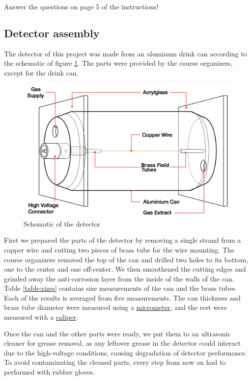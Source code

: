 \documentclass[a4paper]{article}
\begin{document}
Answer the questions on page 5 of the instructions!


\subsection{Detector assembly}
\label{assembly}
The detector of this project was made from an aluminum drink can according to the schematic of figure \ref{fig:schematic}.
The parts were provided by the course organizers, except for the drink can.

\begin{figure}[ht!]
\centering
\includegraphics[width=\textwidth]{fig/instructions/schematic.png}
\caption{Schematic of the detector \cite{instructions}}
\label{fig:schematic}
\end{figure}

First we prepared the parts of the detector by removing a single strand from a copper wire and cutting two pieces of brass tube for the wire mounting.
The course organizers removed the top of the can and drilled two holes to its bottom, one to the center and one off-center.
We then smoothened the cutting edges and grinded away the anti-corrosion layer from the inside of the walls of the can.
Table \ref{table:sizes} contains size measurements of the can and the brass tubes.
Each of the results is averaged from five measurements.
The can thickness and brass tube diameter were measured using a
\href{https://en.wikipedia.org/wiki/Micrometer}{micrometer}, and the rest were measured with a
\href{https://en.wikipedia.org/wiki/Calipers}{caliper}.

Once the can and the other parts were ready, we put them to an ultrasonic cleaner for grease removal, as any leftover grease in the detector could interact due to the high-voltage conditions, causing degradation of detector performance.
To avoid contaminating the cleaned parts, every step from now on had to performed with rubber gloves.
\end{document}
